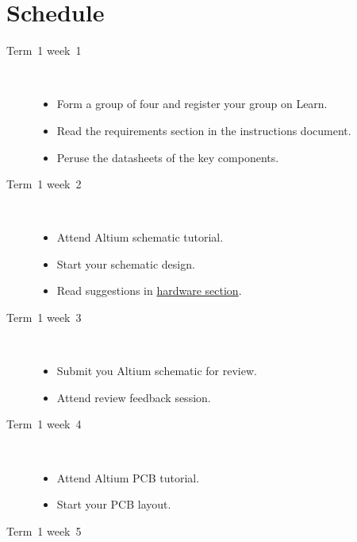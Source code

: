 \chapter{Schedule}

\begin{description}
\item [Term~1 week~1]\mbox{}\\

  \begin{itemize}
  \item Form a group of four and register your group on Learn.
  \item Read the requirements section in the instructions document.
  \item Peruse the datasheets of the key components.
  \end{itemize}
  
\item [Term~1 week~2]\mbox{}\\
  
  \begin{itemize}
  \item Attend Altium schematic tutorial.
  \item Start your schematic design.
  \item Read suggestions in \hyperref[hardware]{hardware section}.
  \end{itemize}
  
\item [Term~1 week~3]\mbox{}\\
  
  \begin{itemize}
  \item Submit you Altium schematic for review.
  \item Attend review feedback session.
  \end{itemize}
  
\item [Term~1 week~4]\mbox{}\\
  
  \begin{itemize}
  \item Attend Altium PCB tutorial.
  \item Start your PCB layout.
  \end{itemize}
  
  
\item [Term~1 week~5]\mbox{}\\
  

\end{description}
